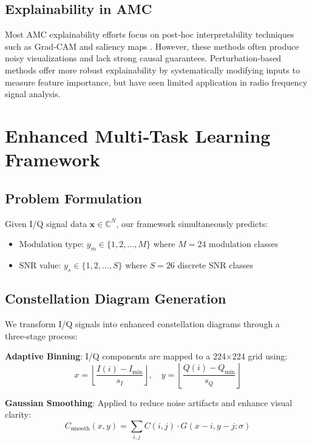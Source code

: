 \documentclass{ELSP}
\begin{document}
\subsection{Explainability in AMC}
Most AMC explainability efforts focus on post‑hoc interpretability techniques such as Grad‑CAM \cite{selvaraju2017grad} and saliency maps \cite{simonyan2013deep}. However, these methods often produce noisy visualizations and lack strong causal guarantees. Perturbation‑based methods \cite{fong2017interpretable,petsiuk2018rise} offer more robust explainability by systematically modifying inputs to measure feature importance, but have seen limited application in radio frequency signal analysis.

\section{Enhanced Multi‑Task Learning Framework}

\subsection{Problem Formulation}

Given I/Q signal data $\mathbf{x} \in \mathbb{C}^N$, our framework simultaneously predicts:
\begin{itemize}
\item Modulation type: $y_m \in \{1, 2, ..., M\}$ where $M=24$ modulation classes
\item SNR value: $y_s \in \{1, 2, ..., S\}$ where $S=26$ discrete SNR classes
\end{itemize}

\subsection{Constellation Diagram Generation}

We transform I/Q signals into enhanced constellation diagrams through a three‑stage process:

\textbf{Adaptive Binning}: I/Q components are mapped to a 224×224 grid using:
\begin{equation}
x = \left\lfloor \frac{I(i) - I_{\min}}{s_I} \right\rfloor, \quad y = \left\lfloor \frac{Q(i) - Q_{\min}}{s_Q} \right\rfloor
\end{equation}

\textbf{Gaussian Smoothing}: Applied to reduce noise artifacts and enhance visual clarity:
\begin{equation}
C_{\text{smooth}}(x,y) = \sum_{i,j} C(i,j) \cdot G(x-i, y-j; \sigma)
\end{equation}
\end{document}
